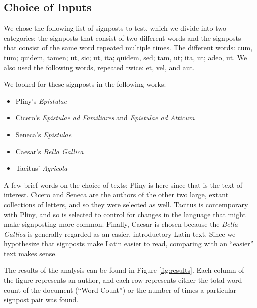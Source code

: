 \subsection{Choice of Inputs}

We chose the following list of signposts to test, which we divide into two categories: the signposts that consist of two different words and the signposts that consist of the same word repeated multiple times. The different words: cum, tum; quidem, tamen; ut, sic; ut, ita; quidem, sed; tam, ut; ita, ut; adeo, ut. We also used the following words, repeated twice: et, vel, and aut.

We looked for these signposts in the following works:
\begin{itemize}
  \item Pliny's \textit{Epistulae}
  \item Cicero's \textit{Epistulae ad Familiares} and \textit{Epistulae ad Atticum}
  \item Seneca's \textit{Epistulae}
  \item Caesar's \textit{Bella Gallica}
  \item Tacitus' \textit{Agricola}
\end{itemize}

A few brief words on the choice of texts: Pliny is here since that is the text of interest. Cicero and Seneca are the authors of the other two large, extant collections of letters, and so they were selected as well. Tacitus is contemporary with Pliny, and so is selected to control for changes in the language that might make signposting more common. Finally, Caesar is chosen because the \textit{Bella Gallica} is generally regarded as an easier, introductory Latin text. Since we hypothesize that signposts make Latin easier to read, comparing with an ``easier'' text makes sense.

The results of the analysis can be found in Figure \ref{fig:results}. Each column of the figure represents an author, and each row represents either the total word count of the document (``Word Count'') or the number of times a particular signpost pair was found.

